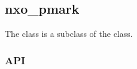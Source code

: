 %
%
%
%
%

\subsection{nxo\_pmark}
\label{nxo_pmark}

The  class is a subclass of the  class.

\subsubsection{API}

